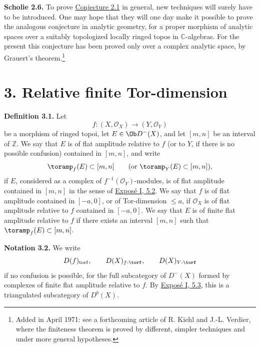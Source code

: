 \textbf{Scholie 2.6.} To prove \hyperlink{sga6.e03.conj.2-1}{Conjecture 2.1} in general, new techniques will surely have to be introduced. One may hope that they will one day make it possible to prove the analogous conjecture in analytic geometry, for a proper morphism of analytic spaces over a suitably topologized locally ringed topos in \(\mathbb C\)-algebras. For the present this conjecture has been proved only over a complex analytic space, by Grauert's theorem.\footnote{Added in April 1971: see a forthcoming article of R. Kiehl and J.-L. Verdier, where the finiteness theorem is proved by different, simpler techniques and under more general hypotheses.}

\section*{3. Relative finite Tor-dimension}

\textbf{Definition 3.1.} Let
\[
  f:(X,\mathcal O_X)\longrightarrow (Y,\mathcal O_Y)
\]
be a morphism of ringed topoi, let \(E\in\Ob D^{-}(X)\), and let \([m,n]\) be an interval of \(\mathbb Z\). We say that \(E\) is of flat amplitude relative to \(f\) (or to \(Y\), if there is no possible confusion) contained in \([m,n]\), and write
\[
  \toramp_f(E)\subset [m,n]\qquad(\text{or }\toramp_Y(E)\subset [m,n]),
\]
if \(E\), considered as a complex of \(f^{-1}(\mathcal O_Y)\)-modules, is of flat amplitude contained in \([m,n]\) in the sense of \hyperlink{sga6.e01.def.5-2}{Exposé I, 5.2}. We say that \(f\) is of flat amplitude contained in \([-a,0]\), or of Tor-dimension \(\leq a\), if \(\mathcal O_X\) is of flat amplitude relative to \(f\) contained in \([-a,0]\). We say that \(E\) is of finite flat amplitude relative to \(f\) if there exists an interval \([m,n]\) such that \(\toramp_f(E)\subset[m,n]\).

\textbf{Notation 3.2.} We write
\[
  D(f)_{\mathrm{torf}},\qquad D(X)_{f\text{-}\torf},\qquad D(X)_{Y\text{-}\torf}
\]
if no confusion is possible, for the full subcategory of \(D^{-}(X)\) formed by complexes of finite flat amplitude relative to \(f\). By \hyperlink{sga6.e01.para.5-3}{Exposé I, 5.3}, this is a triangulated subcategory of \(D^b(X)\).


